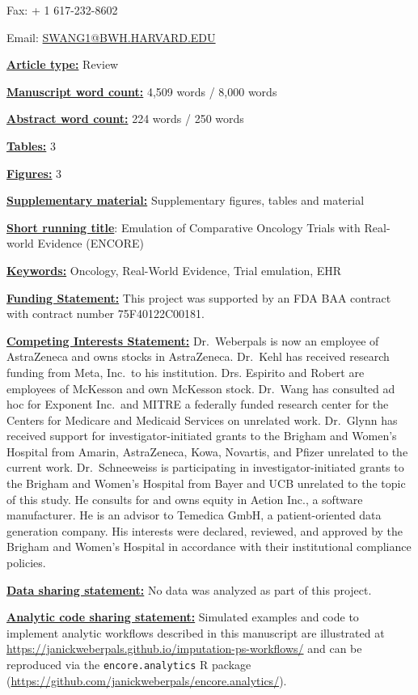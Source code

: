 \documentclass[
  letterpaper,
  DIV=11,
  numbers=noendperiod]{scrartcl}
\begin{document}
Fax: + 1 617-232-8602

Email: \url{SWANG1@BWH.HARVARD.EDU}

\ul{\textbf{Article type:}} Review

\ul{\textbf{Manuscript word count:}} 4,509 words / 8,000 words

\ul{\textbf{Abstract word count:}} 224 words / 250 words

\ul{\textbf{Tables:}} 3

\ul{\textbf{Figures:}} 3

\ul{\textbf{Supplementary material:}} Supplementary figures, tables and
material

\ul{\textbf{Short running title}}: Emulation of Comparative Oncology
Trials with Real-world Evidence (ENCORE)

\ul{\textbf{Keywords:}} Oncology, Real-World Evidence, Trial emulation,
EHR

\ul{\textbf{Funding Statement:}} This project was supported by an FDA
BAA contract with contract number 75F40122C00181.

\ul{\textbf{Competing Interests Statement:}} Dr.~Weberpals is now an
employee of AstraZeneca and owns stocks in AstraZeneca. Dr.~Kehl has
received research funding from Meta, Inc.~to his institution. Drs.
Espirito and Robert are employees of McKesson and own McKesson stock.
Dr.~Wang has consulted ad hoc for Exponent Inc.~and MITRE a federally
funded research center for the Centers for Medicare and Medicaid
Services on unrelated work. Dr.~Glynn has received support for
investigator-initiated grants to the Brigham and Women's Hospital from
Amarin, AstraZeneca, Kowa, Novartis, and Pfizer unrelated to the current
work. Dr.~Schneeweiss is participating in investigator-initiated grants
to the Brigham and Women's Hospital from Bayer and UCB unrelated to the
topic of this study. He consults for and owns equity in Aetion Inc., a
software manufacturer. He is an advisor to Temedica GmbH, a
patient-oriented data generation company. His interests were declared,
reviewed, and approved by the Brigham and Women's Hospital in accordance
with their institutional compliance policies.

\ul{\textbf{Data sharing statement:}} No data was analyzed as part of
this project.

\ul{\textbf{Analytic code sharing statement:}} Simulated examples and
code to implement analytic workflows described in this manuscript are
illustrated at
\url{https://janickweberpals.github.io/imputation-ps-workflows/} and can
be reproduced via the \texttt{encore.analytics} R package
(\url{https://github.com/janickweberpals/encore.analytics/}).
\end{document}
